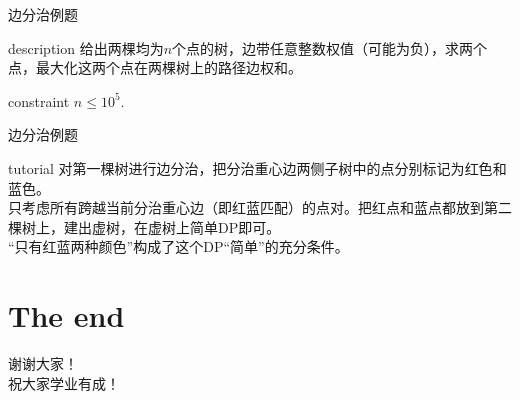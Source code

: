 \documentclass{beamer}
\begin{document}
\begin{frame}{边分治例题}
	\begin{block}{description}
		给出两棵均为$n$个点的树，边带任意整数权值（可能为负），求两个点，最大化这两个点在两棵树上的路径边权和。
	\end{block}
	\begin{block}{constraint}
		$n \le 10^5.$
	\end{block}
\end{frame}
\begin{frame}{边分治例题}
	\begin{block}{tutorial}
		对第一棵树进行边分治，把分治重心边两侧子树中的点分别标记为{\color{red}红色}和{\color{blue}蓝色}。\\
		
		只考虑所有跨越当前分治重心边（即{\color{red}红}{\color{blue}蓝}匹配）的点对。把{\color{red}红点}和{\color{blue}蓝点}都放到第二棵树上，建出虚树，在虚树上简单DP即可。\\
		
		“只有{\color{red}红}{\color{blue}蓝}两种颜色”构成了这个DP“简单”的充分条件。
	\end{block}
\end{frame}

\section{The end}
\begin{frame}
	\begin{center}
		{\huge 谢谢大家！\\  \large 祝大家学业有成！}
	\end{center}
\end{frame}
\end{document}
